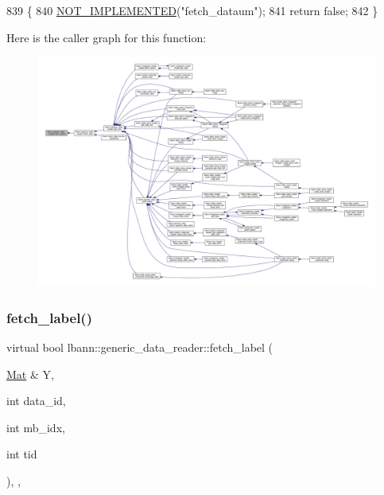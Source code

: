 \begin{DoxyCode}
839                                                                      \{
840     \hyperlink{data__reader_8hpp_a10d485225119e927ae18857acf81bdc6}{NOT\_IMPLEMENTED}(\textcolor{stringliteral}{"fetch\_dataum"});
841     \textcolor{keywordflow}{return} \textcolor{keyword}{false};
842   \}
\end{DoxyCode}
Here is the caller graph for this function\+:\nopagebreak
\begin{figure}[H]
\begin{center}
\leavevmode
\includegraphics[width=350pt]{classlbann_1_1generic__data__reader_a0a3cd87ed4a7057df185e0087f2d21c1_icgraph}
\end{center}
\end{figure}
\mbox{\label{classlbann_1_1generic__data__reader_a03627408c1d1aa28691d31232fe1dce5}} 
\subsubsection{\texorpdfstring{fetch\+\_\+label()}{fetch\_label()}}
{\footnotesize\ttfamily virtual bool lbann\+::generic\+\_\+data\+\_\+reader\+::fetch\+\_\+label (\begin{DoxyParamCaption}\item[{\hyperlink{base_8hpp_a68f11fdc31b62516cb310831bbe54d73}{Mat} \&}]{Y,  }\item[{int}]{data\+\_\+id,  }\item[{int}]{mb\+\_\+idx,  }\item[{int}]{tid }\end{DoxyParamCaption})\hspace{0.3cm}{\ttfamily [inline]}, {\ttfamily [protected]}, {\ttfamily [virtual]}}

